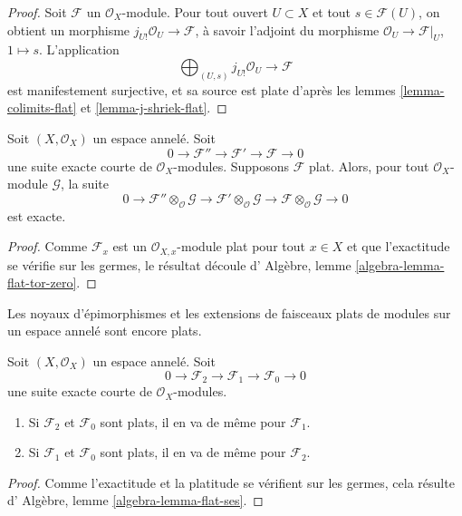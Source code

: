 \begin{proof}
Soit $\mathcal{F}$ un $\mathcal{O}_X$-module.
Pour tout ouvert $U \subset X$ et tout
$s \in \mathcal{F}(U)$, on obtient un morphisme
$j_{U!}\mathcal{O}_U \to \mathcal{F}$, à savoir l'adjoint du
morphisme $\mathcal{O}_U \to \mathcal{F}|_U$, $1 \mapsto s$.
L'application
$$
\bigoplus\nolimits_{(U, s)} j_{U!}\mathcal{O}_U
\longrightarrow
\mathcal{F}
$$
est manifestement surjective, et sa source est plate d'après les lemmes
\ref{lemma-colimits-flat} et \ref{lemma-j-shriek-flat}.
\end{proof}

\begin{lemma}
\label{lemma-flat-tor-zero}
Soit $(X, \mathcal{O}_X)$ un espace annelé.
Soit
$$
0 \to \mathcal{F}'' \to \mathcal{F}' \to \mathcal{F} \to 0
$$
une suite exacte courte de $\mathcal{O}_X$-modules.
Supposons $\mathcal{F}$ plat. Alors, pour tout $\mathcal{O}_X$-module
$\mathcal{G}$, la suite
$$
0 \to
\mathcal{F}'' \otimes_\mathcal{O} \mathcal{G} \to
\mathcal{F}' \otimes_\mathcal{O} \mathcal{G} \to
\mathcal{F} \otimes_\mathcal{O} \mathcal{G} \to 0
$$
est exacte.
\end{lemma}

\begin{proof}
Comme $\mathcal{F}_x$ est un $\mathcal{O}_{X, x}$-module plat
pour tout $x \in X$ et que l'exactitude se vérifie sur les germes, le résultat
découle d'
Algèbre, lemme \ref{algebra-lemma-flat-tor-zero}.
\end{proof}

\begin{lemma}
\label{lemma-flat-ses}
\begin{slogan}
Les noyaux d'épimorphismes et les extensions de faisceaux plats de modules sur
un espace annelé sont encore plats.
\end{slogan}
Soit $(X, \mathcal{O}_X)$ un espace annelé.
Soit
$$
0 \to
\mathcal{F}_2 \to
\mathcal{F}_1 \to
\mathcal{F}_0 \to 0
$$
une suite exacte courte de $\mathcal{O}_X$-modules.
\begin{enumerate}
\item Si $\mathcal{F}_2$ et $\mathcal{F}_0$ sont plats, il en va de même pour
$\mathcal{F}_1$.
\item Si $\mathcal{F}_1$ et $\mathcal{F}_0$ sont plats, il en va de même pour
$\mathcal{F}_2$.
\end{enumerate}
\end{lemma}

\begin{proof}
Comme l'exactitude et la platitude se vérifient sur les germes,
cela résulte d'
Algèbre, lemme \ref{algebra-lemma-flat-ses}.
\end{proof}

